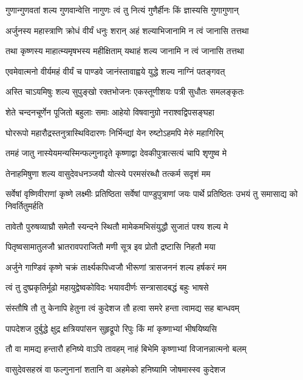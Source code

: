 \twolineshloka
{गुणान्गुणवतां शल्य गुणवान्वेत्ति नागुणः}
{त्वं तु नित्यं गुणैर्हीनः किं ज्ञास्यसि गुणागुणान्}


\twolineshloka
{अर्जुनस्य महास्त्राणि क्रोधं वीर्यं धनुः शरान्}
{अहं शल्याभिजानामि न त्वं जानासि तत्तथा}


\twolineshloka
{तथा कृष्णस्य माहात्म्यमृषभस्य महीक्षिताम्}
{यथाहं शल्य जानामि न त्वं जानासि तत्तथा}


\twolineshloka
{एवमेवात्मनो वीर्यमहं वीर्यं च पाण्डवे}
{जानंस्तावाह्वये युद्धे शल्य नाग्निं पतङ्गवत्}


\twolineshloka
{अस्ति चाऽयमिषुः शल्य सुपुङ्खो रक्तभोजनः}
{एकस्तूणीशयः पत्री सुधौतः समलङ्कृतः}


\twolineshloka
{शेते चन्दनचूर्णेन पूजितो बहुलाः समाः}
{आहेयो विषवानुग्रो नराश्वद्विपसङ्घहा}


\twolineshloka
{घोररूपो महारौद्रस्तनुत्रास्थिविदारणः}
{निर्भिन्द्यां येन रुष्टोऽहमपि मेरुं महागिरिम्}


\twolineshloka
{तमहं जातु नास्येयमन्यस्मिन्फल्गुनादृते}
{कृष्णाद्वा देवकीपुत्रात्सत्यं चापि शृणुष्व मे}


\twolineshloka
{तेनाहमिषुणा शल्य वासुदेवधनञ्जयौ}
{योत्स्ये परमसंरब्धौ तत्कर्म सदृशं मम}


\threelineshloka
{सर्वेषां वृष्णिवीराणां कृष्णे लक्ष्मीः प्रतिष्ठिता}
{सर्वेषां पाण्डुपुत्राणां जयः पार्थे प्रतिष्ठितः}
{उभयं तु समासाद्य को निवर्तितुमर्हति}


\twolineshloka
{तावेतौ पुरुषव्याघ्रौ समेतौ स्यन्दने स्थितौ}
{मामेकमभिसंयुद्धौ सुजातं पश्य शल्य मे}


\twolineshloka
{पितृष्वसामातुलजौ भ्रातरावपराजितौ}
{मणी सूत्र इव प्रोतौ द्रष्टासि निहतौ मया}


\twolineshloka
{अर्जुने गाण्डिवं कृष्णे चक्रं तार्क्ष्यकपिध्वजौ}
{भीरूणां त्रासजननं शल्य हर्षकरं मम}


\twolineshloka
{त्वं तु दुष्प्रकृतिर्मूढो महायुद्वेष्वकोविदः}
{भयावदीर्णः सन्त्रासादबद्धं बहुः भाषसे}


\twolineshloka
{संस्तौषि तौ तु केनापि हेतुना त्वं कुदेशज}
{तौ हत्वा समरे हन्ता त्वामद्य सह बान्धवम्}


\twolineshloka
{पापदेशज दुर्बुद्धे क्षुद्र क्षत्रियपांसन}
{सुहृद्रूपो रिपुः किं मां कृष्णाभ्यां भीषयिष्यसि}


\twolineshloka
{तौ वा मामद्य हन्तारौ हनिष्ये वाऽपि तावहम्}
{नाहं बिभेमि कृष्णाभ्यां विजानन्नात्मनो बलम्}


\twolineshloka
{वासुदेवसहस्रं वा फल्गुनानां शतानि वा}
{अहमेको हनिष्यामि जोषमास्स्व कुदेशज}


